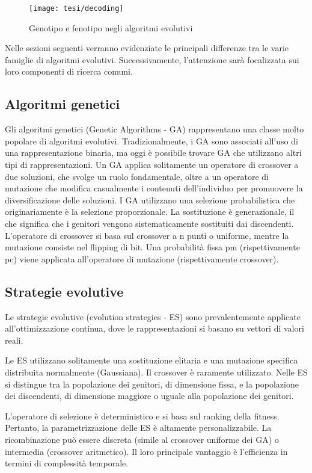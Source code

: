 \begin{figure}[!ht] 
    \centering 
    \texttt{[image: tesi/decoding]} 
    \caption{Genotipo e fenotipo negli algoritmi evolutivi}
\end{figure}

Nelle sezioni seguenti verranno evidenziate le principali differenze tra le varie famiglie di algoritmi evolutivi. Successivamente, l'attenzione sarà focalizzata sui loro componenti di ricerca comuni.

\subsection{Algoritmi genetici}

Gli algoritmi genetici (Genetic Algorithms - GA) rappresentano una classe molto popolare di algoritmi evolutivi. Tradizionalmente, i GA sono associati all'uso di una rappresentazione binaria, ma oggi è possibile trovare GA che utilizzano altri tipi di rappresentazioni. Un GA applica solitamente un operatore di crossover a due soluzioni, che svolge un ruolo fondamentale, oltre a un operatore di mutazione che modifica casualmente i contenuti dell'individuo per promuovere la diversificazione delle soluzioni. I GA utilizzano una selezione probabilistica che originariamente è la selezione proporzionale. La sostituzione è generazionale, il che significa che i genitori vengono sistematicamente sostituiti dai discendenti. L'operatore di crossover si basa sul crossover a n punti o uniforme, mentre la mutazione consiste nel flipping di bit. Una probabilità fissa pm (rispettivamente pc) viene applicata all'operatore di mutazione (rispettivamente crossover).

\subsection{Strategie evolutive}

Le strategie evolutive (evolution strategies - ES) sono prevalentemente applicate all'ottimizzazione continua, dove le rappresentazioni si basano su vettori di valori reali.

Le ES utilizzano solitamente una sostituzione elitaria e una mutazione specifica distribuita normalmente (Gaussiana). Il crossover è raramente utilizzato. Nelle ES si distingue tra la popolazione dei genitori, di dimensione fissa, e la popolazione dei discendenti, di dimensione maggiore o uguale alla popolazione dei genitori. 

L'operatore di selezione è deterministico e si basa sul ranking della fitness. Pertanto, la parametrizzazione delle ES è altamente personalizzabile. La ricombinazione può essere discreta (simile al crossover uniforme dei GA) o intermedia (crossover aritmetico). Il loro principale vantaggio è l'efficienza in termini di complessità temporale.

